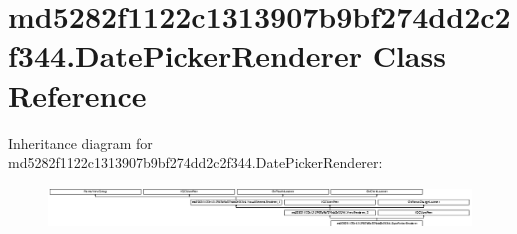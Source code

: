 \hypertarget{classmd5282f1122c1313907b9bf274dd2c2f344_1_1DatePickerRenderer}{}\section{md5282f1122c1313907b9bf274dd2c2f344.\+Date\+Picker\+Renderer Class Reference}
\label{classmd5282f1122c1313907b9bf274dd2c2f344_1_1DatePickerRenderer}
Inheritance diagram for md5282f1122c1313907b9bf274dd2c2f344.\+Date\+Picker\+Renderer\+:\begin{figure}[H]
\begin{center}
\leavevmode
\includegraphics[height=1.098039cm]{classmd5282f1122c1313907b9bf274dd2c2f344_1_1DatePickerRenderer}
\end{center}
\end{figure}
